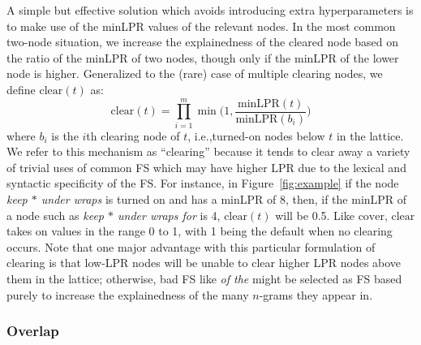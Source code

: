 \documentclass[11pt,letterpaper]{article}
\makeatletter
\def \ie {i.e.,\@ }
\newcommand{\gap}{$*$\xspace}
\newcommand{\ex}[1]{\textit{#1}\xspace}
\newcommand{\minLPR}{\ensuremath{\text{minLPR}}}
\newcommand{\cover}{\ensuremath{\text{cover}}\xspace}
\newcommand{\clear}{\ensuremath{\text{clear}}\xspace}
\newcommand{\figref}[2][]{Figure#1~\ref{#2}\xspace}
\makeatother
\begin{document}
A simple but effective solution which avoids introducing extra hyperparameters is to make use of the minLPR values of the relevant nodes. In the most common two-node situation, we increase the explainedness of the cleared node based on the ratio of the minLPR of two nodes, though only if the minLPR of the lower node is higher. Generalized to the (rare) case of multiple clearing nodes, we define $\clear(t)$ as:
\begin{displaymath}
\clear(t) = \prod_{i=1}^{m}{\min\Big(1,\frac{\minLPR(t)}{\minLPR(b_i)}\Big)}
\end{displaymath}
where $b_i$ is the $i$th clearing node of $t$, \ie turned-on nodes below $t$ in the lattice. We refer to this mechanism as ``clearing'' because it tends to clear away a variety of trivial uses of common FS which may have higher LPR due to the lexical and syntactic specificity of the FS. For instance, in \figref{fig:example} if the node \ex{keep \gap under wraps}  is turned on and has a minLPR of 8, then, if the minLPR of a node such as \ex{keep \gap under wraps for} is 4, $\clear(t)$ will be 0.5. Like \cover, \clear takes on values in the range 0 to 1, with 1 being the default when no clearing occurs. Note that one major advantage with this particular formulation of clearing is that low-LPR nodes will be unable to clear higher LPR nodes above them in the lattice; otherwise, bad FS like \ex{of the} might be selected as FS based purely to increase the explainedness of the many $n$-grams they appear in.



\subsubsection{Overlap}
\end{document}
